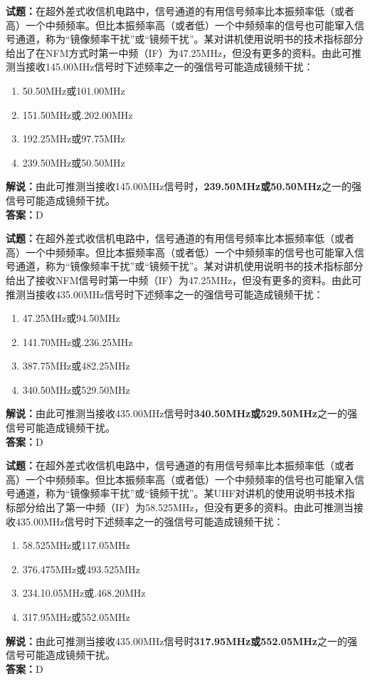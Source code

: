 \documentclass{ctexbook}
\begin{document}
\bigskip


\noindent\textbf{试题：}在超外差式收信机电路中，信号通道的有用信号频率比本振频率低（或者高）一个中频频率。但比本振频率高（或者低）一个中频频率的信号也可能窜入信号通道，称为“镜像频率干扰”或“镜频干扰”。某对讲机使用说明书的技术指标部分给出了在NFM方式时第一中频（IF）为47.25MHz，但没有更多的资料。由此可推测当接收145.00MHz信号时下述频率之一的强信号可能造成镜频干扰：%
\begin{enumerate}[leftmargin=3em]
\item 50.50MHz或101.00MHz
\item 151.50MHz或.202.00MHz
\item 192.25MHz或97.75MHz
\item 239.50MHz或50.50MHz
\end{enumerate}
\noindent\textbf{解说：}由此可推测当接收145.00MHz信号时，\textbf{239.50MHz或50.50MHz}之一的强信号可能造成镜频干扰。\\\noindent\textbf{答案：}D



\bigskip


\noindent\textbf{试题：}在超外差式收信机电路中，信号通道的有用信号频率比本振频率低（或者高）一个中频频率。但比本振频率高（或者低）一个中频频率的信号也可能窜入信号通道，称为“镜像频率干扰”或“镜频干扰”。某对讲机使用说明书的技术指标部分给出了接收NFM信号时第一中频（IF）为47.25MHz，但没有更多的资料。由此可推测当接收435.00MHz信号时下述频率之一的强信号可能造成镜频干扰：
\begin{enumerate}[leftmargin=3em]
\item 47.25MHz或94.50MHz
\item 141.70MHz或.236.25MHz
\item 387.75MHz或482.25MHz
\item 340.50MHz或529.50MHz
\end{enumerate}
\noindent\textbf{解说：}由此可推测当接收435.00MHz信号时\textbf{340.50MHz或529.50MHz}之一的强信号可能造成镜频干扰。\\\noindent\textbf{答案：}D



\bigskip


\noindent\textbf{试题：}在超外差式收信机电路中，信号通道的有用信号频率比本振频率低（或者高）一个中频频率。但比本振频率高（或者低）一个中频频率的信号也可能窜入信号通道，称为“镜像频率干扰”或“镜频干扰”。某UHF对讲机的使用说明书技术指标部分给出了第一中频（IF）为58.525MHz，但没有更多的资料。由此可推测当接收435.00MHz信号时下述频率之一的强信号可能造成镜频干扰：
\begin{enumerate}[leftmargin=3em]
\item 58.525MHz或117.05MHz
\item 376.475MHz或493.525MHz
\item 234.10.05MHz或.468.20MHz
\item 317.95MHz或552.05MHz
\end{enumerate}
\noindent\textbf{解说：}由此可推测当接收435.00MHz信号时\textbf{317.95MHz或552.05MHz}之一的强信号可能造成镜频干扰。\\\noindent\textbf{答案：}D
\end{document}
